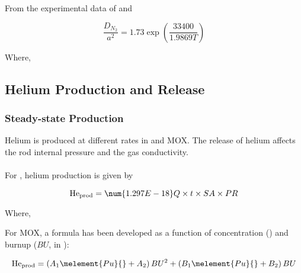 From the experimental data of \cite{ref:Ferrari1963} and \cite{ref:Ferrari1964}

\begin{equation}
    \label{eq:nitrogen_release_d_a}
    \frac{D_{N_{2}}}{a^{2}} = 1.73\exp\left( \frac{33400}{1.9869T} \right)
\end{equation}

Where,

\subsection{Helium Production and Release} \label{section:helium-production-and-release}

\subsubsection{Steady-state Production}\label{section:steady-state-production}

Helium is produced at different rates in  and MOX.  The release of helium affects the
rod internal pressure and the gas conductivity.
\\
\\
For , helium production is given by

\begin{equation}
    \label{eq:he_prod_uo2}
    \text{He}_{\text{prod}} = \num{1.297E-18}Q\times t\times SA\times PR
\end{equation}

Where,

For MOX, a formula has been developed as a function of  concentration
() and burnup (\(BU\), in ):

\begin{equation}
    \label{eq:he_prod_mox}
    \text{He}_{\text{prod}} = \left( A_{1}\melement{Pu}{} + A_{2} \right)BU^{2} + \left( B_{1}\melement{Pu}{} + B_{2} \right)BU
\end{equation}

